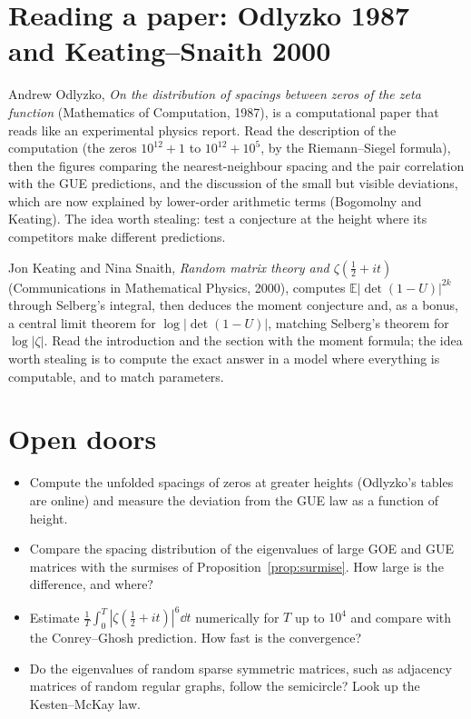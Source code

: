 \section{Reading a paper: Odlyzko 1987 and Keating--Snaith 2000}

Andrew Odlyzko, \emph{On the distribution of spacings between zeros of the zeta function} (Mathematics of Computation, 1987), is a computational paper
that reads like an experimental physics report. Read the description of the computation (the zeros $10^{12}+1$ to $10^{12}+10^5$, by the
Riemann--Siegel formula), then the figures comparing the nearest-neighbour spacing and the pair correlation with the GUE predictions, and the discussion of
the small but visible deviations, which are now explained by lower-order arithmetic terms (Bogomolny and Keating). The idea worth stealing: test a
conjecture at the height where its competitors make different predictions.

Jon Keating and Nina Snaith, \emph{Random matrix theory and $\zeta(\frac12+it)$} (Communications in Mathematical Physics, 2000), computes
$\mathbb E|\det(1-U)|^{2k}$ through Selberg's integral, then deduces the moment conjecture and, as a bonus, a central limit theorem for $\log|\det(1-U)|$,
matching Selberg's theorem for $\log|\zeta|$. Read the introduction and the section with the moment formula; the idea worth stealing is to compute the
exact answer in a model where everything is computable, and to match parameters.

\section{Open doors}

\begin{itemize}
\item Compute the unfolded spacings of zeros at greater heights (Odlyzko's tables are online) and measure the deviation from the GUE law as a function of
height.
\item Compare the spacing distribution of the eigenvalues of large GOE and GUE matrices with the surmises of Proposition~\ref{prop:surmise}. How large is
the difference, and where?
\item Estimate $\frac1T\int_0^T|\zeta(\frac12+it)|^6\dd t$ numerically for $T$ up to $10^4$ and compare with the Conrey--Ghosh prediction. How fast is the
convergence?
\item Do the eigenvalues of random sparse symmetric matrices, such as adjacency matrices of random regular graphs, follow the semicircle? Look up
the Kesten--McKay law.
\end{itemize}

